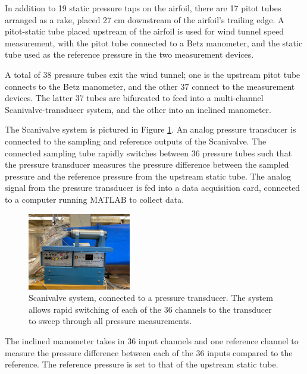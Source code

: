\documentclass[runningheads]{llncs}
\begin{document}
In addition to 19 static pressure taps on the airfoil, there are 17 pitot tubes arranged as a rake, placed 27 cm downstream of the airfoil's trailing edge. A pitot-static tube placed upstream of the airfoil is used for wind tunnel speed measurement, with the pitot tube connected to a Betz manometer, and the static tube used as the reference pressure in the two measurement devices.

A total of 38 pressure tubes exit the wind tunnel; one is the upstream pitot tube connects to the Betz manometer, and the other 37 connect to the measurement devices. The latter 37 tubes are bifurcated to feed into a multi-channel Scanivalve-transducer system, and the other into an inclined manometer.

The Scanivalve system is pictured in Figure \ref{fig:scanivalve}. An analog pressure transducer is connected to the sampling and reference outputs of the Scanivalve. The connected sampling tube rapidly switches between 36 pressure tubes such that the pressure transducer measures the pressure difference between the sampled pressure and the reference pressure from the upstream static tube. The analog signal from the pressure transducer is fed into a data acquisition card, connected to a computer running MATLAB to collect data.

\begin{figure}[h]
    \centering
    \includegraphics[width=0.4\textwidth]{Apparatus Pictures/scanivalve.jpg}
    \caption{Scanivalve system, connected to a pressure transducer. The system allows rapid switching of each of the 36 channels to the transducer to sweep through all pressure measurements.}
    \label{fig:scanivalve}
\end{figure}

The inclined manometer takes in 36 input channels and one reference channel to measure the pressure difference between each of the 36 inputs compared to the reference. The reference pressure is set to that of the upstream static tube.
\end{document}

